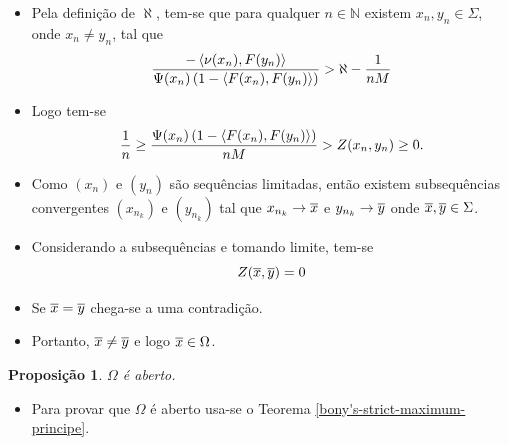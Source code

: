 \documentclass[10pt,a4paper]{beamer}
\newtheorem{proposicao}{Proposição}
\theoremstyle{definition}
\begin{document}
\begin{frame}
		
	\begin{itemize}
		\item Pela definição de $\aleph$, tem-se que para qualquer $n \in \mathbb{N}$ existem $x_n,y_n \in \Sigma$, onde $x_n \neq y_n$, tal que
		\begin{equation*}
			\frac{- \left\langle \nu(x_n),F(y_n) \right\rangle}{\Psi(x_n) \left( 1 - \left\langle F(x_n),F(y_n) \right\rangle \right)} > \aleph - \frac{1}{nM}
		\end{equation*}
		
		\pause
		
		\item Logo tem-se
		\begin{equation*}
			\frac{1}{n} \geq \frac{\Psi(x_n) \left( 1 - \left\langle F(x_n),F(y_n) \right\rangle \right)}{nM} > Z(x_n, y_n) \geq 0.
		\end{equation*}
		
		\pause
		
		\item Como $(x_n)$ e $(y_n)$ são sequências limitadas, então existem subsequências convergentes $(x_{n_k})$ e $(y_{n_k})$ tal que $x_{n_k} \rightarrow \overline{x}$ e $y_{n_k} \rightarrow \overline{y}$ onde $\overline{x},\overline{y} \in \Sigma$.
	\end{itemize}

\end{frame}

\begin{frame}
	\begin{itemize}
		\item Considerando a subsequências e tomando limite, tem-se
		\begin{equation*}
			Z(\overline{x},\overline{y}) = 0
		\end{equation*}
		
		\pause
		
		\item Se $\overline{x} = \overline{y}$ chega-se a uma contradição.
		
		\pause
		
		\item Portanto, $\overline{x} \neq \overline{y}$ e logo $\overline{x} \in \Omega$.
	\end{itemize}

	\pause

	\begin{proposicao}
		$\Omega$ é aberto.
	\end{proposicao}

	\pause

	\begin{itemize}
		\item Para provar que $\Omega$ é aberto usa-se o Teorema \ref{bony's-strict-maximum-principe}.
	\end{itemize}

\end{frame}
\end{document}
